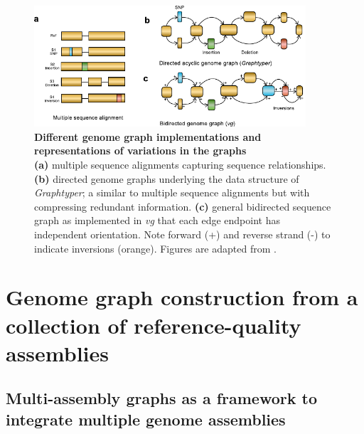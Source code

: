 \documentclass[../main.tex]{subfiles}
\begin{document}
\begin{figure}[!htb]
    \centering
    \includegraphics[width=0.9\textwidth]{intro/fig6.pdf}
        \vspace{3mm}
        \caption[Genetic variant representation in the genome graphs]{\textbf{Different genome graph implementations and representations of variations in the graphs} \\
        \footnotesize{\textbf{(a)} multiple sequence alignments capturing sequence relationships. \textbf{(b)} directed genome graphs underlying the data structure of \emph{Graphtyper}; a similar to multiple sequence alignments but with compressing redundant information. \textbf{(c)} general bidirected sequence graph as implemented in \emph{vg} that each edge endpoint has independent orientation. Note  forward (+) and reverse strand (-) to indicate inversions (orange). Figures are adapted from \citet{eizenga2020pangenome}.}}
        \label{fig16:mut}
\end{figure}


\section[Construction of multi-assembly graphs]{Genome graph construction from a collection of reference-quality assemblies}

\subsection*{Multi-assembly graphs as a framework to integrate multiple genome assemblies}
\end{document}
